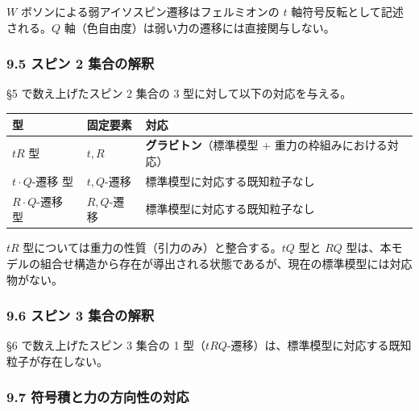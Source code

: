 \documentclass[
  a4paper,11pt]{ltjsarticle}
\newcounter{none}
\theoremstyle{definition}
\theoremstyle{remark}
\begin{document}
\(W\) ボソンによる弱アイソスピン遷移はフェルミオンの \(t\)
軸符号反転として記述される。\(Q\)
軸（色自由度）は弱い力の遷移には直接関与しない。

\subsubsection{9.5 スピン 2
集合の解釈}\label{ux30b9ux30d4ux30f3-2-ux96c6ux5408ux306eux89e3ux91c8}

§5 で数え上げたスピン 2 集合の 3 型に対して以下の対応を与える。

{\def\LTcaptype{none} %
\begin{longtable}[]{@{}
  >{\raggedright\arraybackslash}p{}
  >{\raggedright\arraybackslash}p{}
  >{\raggedright\arraybackslash}p{}@{}}
\toprule\noalign{}
\begin{minipage}[b]{\linewidth}\raggedright
型
\end{minipage} & \begin{minipage}[b]{\linewidth}\raggedright
固定要素
\end{minipage} & \begin{minipage}[b]{\linewidth}\raggedright
対応
\end{minipage} \\
\midrule\noalign{}
\endhead
\bottomrule\noalign{}
\endlastfoot
\(tR\) 型 & \(t, R\) & \textbf{グラビトン}（標準模型 +
重力の枠組みにおける対応） \\
\(t \cdot Q\)-遷移 型 & \(t, Q\)-遷移 &
標準模型に対応する既知粒子なし \\
\(R \cdot Q\)-遷移 型 & \(R, Q\)-遷移 &
標準模型に対応する既知粒子なし \\
\end{longtable}
}

\(tR\) 型については重力の性質（引力のみ）と整合する。\(tQ\) 型と \(RQ\)
型は、本モデルの組合せ構造から存在が導出される状態であるが、現在の標準模型には対応物がない。

\subsubsection{9.6 スピン 3
集合の解釈}\label{ux30b9ux30d4ux30f3-3-ux96c6ux5408ux306eux89e3ux91c8}

§6 で数え上げたスピン 3 集合の 1
型（\(tRQ\)-遷移）は、標準模型に対応する既知粒子が存在しない。

\subsubsection{9.7
符号積と力の方向性の対応}\label{ux7b26ux53f7ux7a4dux3068ux529bux306eux65b9ux5411ux6027ux306eux5bfeux5fdc}
\end{document}
